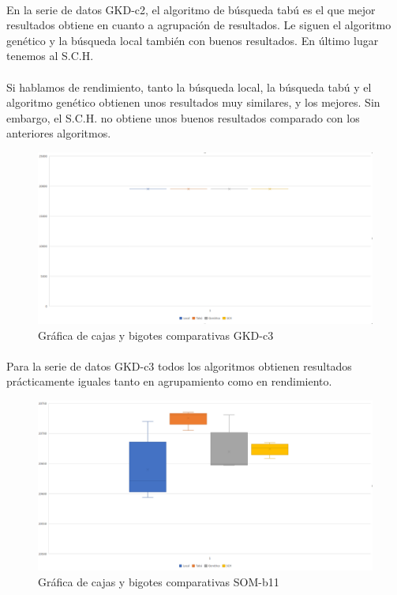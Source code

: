 	\paragraph{}En la serie de datos GKD-c2, el algoritmo de búsqueda tabú es el que mejor resultados obtiene en cuanto a agrupación de resultados. Le siguen el algoritmo genético y la búsqueda local también con buenos resultados. En último lugar tenemos al S.C.H.
	
	\paragraph{}Si hablamos de rendimiento, tanto la búsqueda local, la búsqueda tabú y el algoritmo genético obtienen unos resultados muy similares, y los mejores. Sin embargo, el S.C.H. no obtiene unos buenos resultados comparado con los anteriores algoritmos.

	\begin{figure}[H]
		\centering
		\includegraphics[scale=0.3]{img/finalGKD3.png}
		\caption{Gráfica de cajas y bigotes comparativas GKD-c3}
		\label{GKD-c3_final}
	\end{figure}

	\paragraph{}Para la serie de datos GKD-c3 todos los algoritmos obtienen resultados prácticamente iguales tanto en agrupamiento como en rendimiento.

	\begin{figure}[H]
		\centering
		\includegraphics[scale=0.3]{img/finalSOM1.png}
		\caption{Gráfica de cajas y bigotes comparativas SOM-b11}
		\label{SOM-b11_final}
	\end{figure}

